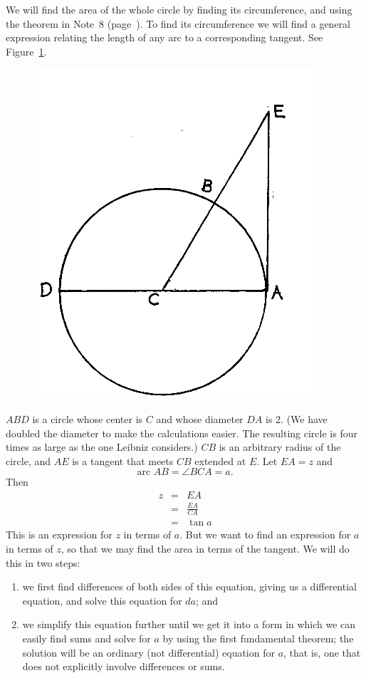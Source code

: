 \documentclass[polutonikogreek,english,twoside,openright]{article}
\begin{document}
We will find the area of the whole circle by finding its
circumference, and using the theorem in Note~8
(page~\pageref{secarea}).  To find its circumference we will find a
general expression relating the length of any arc to a corresponding
tangent. See Figure~\ref{circtan}.
\begin{figure}[htp]
  \begin{center}
    \includegraphics[width=.5\textwidth]{fig/Figure61}
    \caption{}
    \label{circtan}
    \vspace{-10pt}
  \end{center}
\end{figure}
$ABD$ is a circle whose center is $C$ and whose diameter $DA$ is
2. (We have doubled the diameter to make the calculations easier.  The
resulting circle is four times as large as the one Leibniz considers.)
$CB$ is an arbitrary radius of the circle, and $AE$ is a tangent that
meets $CB$ extended at $E$.  Let $EA= z$ and
$$\mbox{arc }AB = \angle BCA = a.$$ Then
\setlength{\jot}{1.5ex}
\begin{eqnarray*}
  z & = & EA \\
    & = & \frac{EA}{CA}\\
    & = & \tan a
\end{eqnarray*}
This is an expression for $z$ in terms of $a$.  But we want to find an
expression for $a$ in terms of $z$, so that we may find the area in
terms of the tangent.  We will do this in two steps:
\begin{enumerate}
\item we first find differences of both sides of this equation, giving
  us a differential equation, and solve this equation for $da$; and
\item we simplify this equation further until we get it into a form in
  which we can easily find sums and solve for $a$ by using the first
  fundamental theorem; the solution will be an ordinary (not
  differential) equation for $a$, that is, one that does not
  explicitly involve differences or sums.
\end{enumerate}
\end{document}
